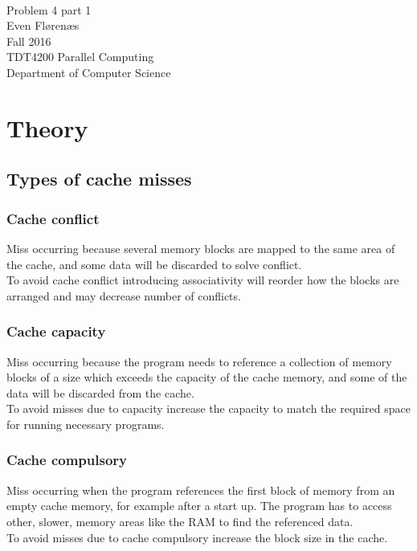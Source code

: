\documentclass[12pt]{article}
\begin{document}
\thispagestyle{empty}
\mbox{}\\[6pc]
\begin{center}
\Huge{Problem 4 part 1}\\[2pc]

\Large{Even Flørenæs}\\[1pc]
\Large{Fall 2016}\\[2pc]

TDT4200 Parallel Computing\\
Department of Computer Science
\end{center}
\vfill

\newpage
\tableofcontents
\newpage
\section{Theory}
\subsection{Types of cache misses}
\subsubsection{Cache conflict}
Miss occurring because several memory blocks are mapped to the same area of the cache, and some data will be discarded to solve conflict. 
\\[10pt]
To avoid cache conflict introducing associativity will reorder how the blocks are arranged and may decrease number of conflicts. 
\subsubsection{Cache capacity}
Miss occurring because the program needs to reference a collection of memory blocks of a size which exceeds the capacity of the cache memory, and some of the data will be discarded from the cache.
\\[10pt]
To avoid misses due to capacity increase the capacity to match the required space for running necessary programs.
\subsubsection{Cache compulsory}
Miss occurring when the program references the first block of memory from an empty cache memory, for example after a start up. The program has to access other, slower, memory areas like the RAM to find the referenced data.
\\[10pt]
To avoid misses due to cache compulsory increase the block size in the cache.
\end{document}
